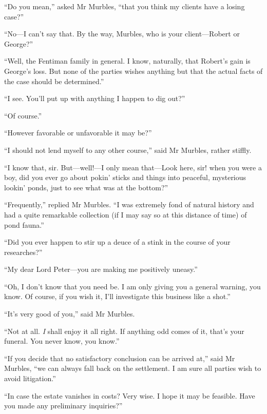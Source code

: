 \enquote{Do you mean,} asked Mr Murbles, \enquote{that you think my clients have a losing case?}

\enquote{No\allowbreak---\allowbreak I can't say that. By the way, Murbles, who is your client\allowbreak---\allowbreak Robert or George?}

\enquote{Well, the Fentiman family in general. I know, naturally, that Robert's gain is George's loss. But none of the parties wishes anything but that the actual facts of the case should be determined.}

\enquote{I see. You'll put up with anything I happen to dig out?}

\enquote{Of course.}

\enquote{However favorable or unfavorable it may be?}

\enquote{I should not lend myself to any other course,} said Mr Murbles, rather stiffly.

\enquote{I know that, sir. But\allowbreak---\allowbreak well!---I only mean that\allowbreak---\allowbreak Look here, sir! when you were a boy, did you ever go about pokin' sticks and things into peaceful, mysterious lookin' ponds, just to see what was at the bottom?}

\enquote{Frequently,} replied Mr Murbles. \enquote{I was extremely fond of natural history and had a quite remarkable collection (if I may say so at this distance of time) of pond fauna.}

\enquote{Did you ever happen to stir up a deuce of a stink in the course of your researches?}

\enquote{My dear Lord Peter\allowbreak---\allowbreak you are making me positively uneasy.}

\enquote{Oh, I don't know that you need be. I am only giving you a general warning, you know. Of course, if you wish it, I'll investigate this business like a shot.}

\enquote{It's very good of you,} said Mr Murbles.

\enquote{Not at all. \textit{I} shall enjoy it all right. If anything odd comes of it, that's your funeral. You never know, you know.}

\enquote{If you decide that no satisfactory conclusion can be arrived at,} said Mr Murbles, \enquote{we can always fall back on the settlement. I am sure all parties wish to avoid litigation.}

\enquote{In case the estate vanishes in costs? Very wise. I hope it may be feasible. Have you made any preliminary inquiries?}

